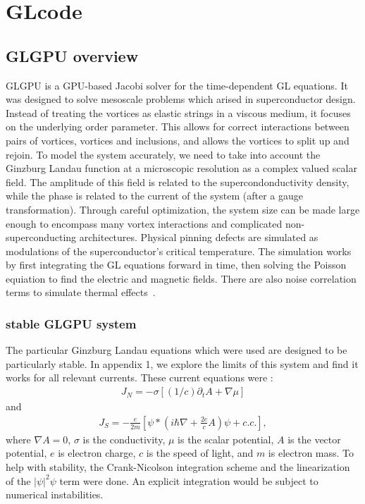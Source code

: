 \chapter{GLcode}          %
\label{codechap}

\section{GLGPU overview}
GLGPU is a GPU-based Jacobi solver for the time-dependent GL equations. It was designed to solve mesoscale problems which arised in superconductor design. Instead of treating the vortices as elastic strings in a viscous medium, it focuses on the underlying order parameter. This allows for correct interactions between pairs of vortices, vortices and inclusions, and allows the vortices to split up and rejoin. To model the system accurately, we need to take into account the Ginzburg Landau function at a microscopic resolution as a complex valued scalar field. The amplitude of this field is related to the supercondonductivity density, while the phase is related to the current of the system (after a gauge transformation). Through careful optimization, the system size can be made large enough to encompass many vortex interactions and complicated non-superconducting architectures. Physical pinning defects are simulated as modulations of the superconductor's critical temperature. The simulation works by first integrating the GL equations forward in time, then solving the Poisson equiation to find the electric and magnetic fields. There are also noise correlation terms to simulate thermal effects~\cite{Sadovskyy14}.

\subsection{stable GLGPU system}
The particular Ginzburg Landau equations which were used are designed to be particularly stable. In appendix 1, we explore the limits of this system and find it works for all relevant currents. These current equations were :
\begin{eqnarray}
J_N = -\sigma [(1/c) \partial_t A + \nabla \mu ]
\label{currentEq1}
\end{eqnarray}
and
\begin{eqnarray}
J_S = -\frac{e}{2m} [\psi*(i\hbar \nabla + \frac{2e}{c} A) \psi + c.c.],
\label{currentEq2}
\end{eqnarray}
where $\nabla A = 0$, $\sigma$ is the conductivity, $\mu$ is the scalar potential, $A$ is the vector potential, $e$ is electron charge, $c$ is the speed of light, and $m$ is electron mass. To help with stability, the Crank-Nicolson integration scheme and the linearization of the $|\psi|^2\psi$ term were done. An explicit integration would be subject to numerical instabilities. 

